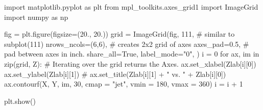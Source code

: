\documentclass[
  letterpaper,
  DIV=11,
  numbers=noendperiod]{scrreprt}
\newenvironment{Shaded}{\begin{snugshade}}{\end{snugshade}}
\newcommand{\BuiltInTok}[1]{\textcolor[rgb]{0.00,0.23,0.31}{#1}}
\newcommand{\CommentTok}[1]{\textcolor[rgb]{0.37,0.37,0.37}{#1}}
\newcommand{\ControlFlowTok}[1]{\textcolor[rgb]{0.00,0.23,0.31}{#1}}
\newcommand{\DecValTok}[1]{\textcolor[rgb]{0.68,0.00,0.00}{#1}}
\newcommand{\FloatTok}[1]{\textcolor[rgb]{0.68,0.00,0.00}{#1}}
\newcommand{\ImportTok}[1]{\textcolor[rgb]{0.00,0.46,0.62}{#1}}
\newcommand{\KeywordTok}[1]{\textcolor[rgb]{0.00,0.23,0.31}{#1}}
\newcommand{\NormalTok}[1]{\textcolor[rgb]{0.00,0.23,0.31}{#1}}
\newcommand{\OperatorTok}[1]{\textcolor[rgb]{0.37,0.37,0.37}{#1}}
\newcommand{\StringTok}[1]{\textcolor[rgb]{0.13,0.47,0.30}{#1}}
\newcommand{\VariableTok}[1]{\textcolor[rgb]{0.07,0.07,0.07}{#1}}
\begin{document}
\begin{Shaded}
\begin{Highlighting}[]
\ImportTok{import}\NormalTok{ matplotlib.pyplot }\ImportTok{as}\NormalTok{ plt}
\ImportTok{from}\NormalTok{ mpl\_toolkits.axes\_grid1 }\ImportTok{import}\NormalTok{ ImageGrid}
\ImportTok{import}\NormalTok{ numpy }\ImportTok{as}\NormalTok{ np}

\NormalTok{fig }\OperatorTok{=}\NormalTok{ plt.figure(figsize}\OperatorTok{=}\NormalTok{(}\FloatTok{20.}\NormalTok{, }\FloatTok{20.}\NormalTok{))}
\NormalTok{grid }\OperatorTok{=}\NormalTok{ ImageGrid(fig, }\DecValTok{111}\NormalTok{,  }\CommentTok{\# similar to subplot(111)}
\NormalTok{                 nrows\_ncols}\OperatorTok{=}\NormalTok{(}\DecValTok{6}\NormalTok{,}\DecValTok{6}\NormalTok{),  }\CommentTok{\# creates 2x2 grid of axes}
\NormalTok{                 axes\_pad}\OperatorTok{=}\FloatTok{0.5}\NormalTok{,  }\CommentTok{\# pad between axes in inch.}
\NormalTok{                 share\_all}\OperatorTok{=}\VariableTok{True}\NormalTok{,}
\NormalTok{                 label\_mode}\OperatorTok{=}\StringTok{"0"}\NormalTok{,}
\NormalTok{                 ) }
\NormalTok{i }\OperatorTok{=} \DecValTok{0}
\ControlFlowTok{for}\NormalTok{ ax, im }\KeywordTok{in} \BuiltInTok{zip}\NormalTok{(grid, Z):}
    \CommentTok{\# Iterating over the grid returns the Axes.}
\NormalTok{    ax.set\_xlabel(Zlab[i][}\DecValTok{0}\NormalTok{])}
\NormalTok{    ax.set\_ylabel(Zlab[i][}\DecValTok{1}\NormalTok{])}
    \CommentTok{\# ax.set\_title(Zlab[i][1] + " vs. " + Zlab[i][0])}
\NormalTok{    ax.contourf(X, Y, im, }\DecValTok{30}\NormalTok{, cmap }\OperatorTok{=} \StringTok{"jet"}\NormalTok{,  vmin }\OperatorTok{=} \DecValTok{180}\NormalTok{, vmax }\OperatorTok{=} \DecValTok{360}\NormalTok{)}
\NormalTok{    i }\OperatorTok{=}\NormalTok{ i }\OperatorTok{+} \DecValTok{1}
       
\NormalTok{plt.show()}
\end{Highlighting}
\end{Shaded}
\end{document}
